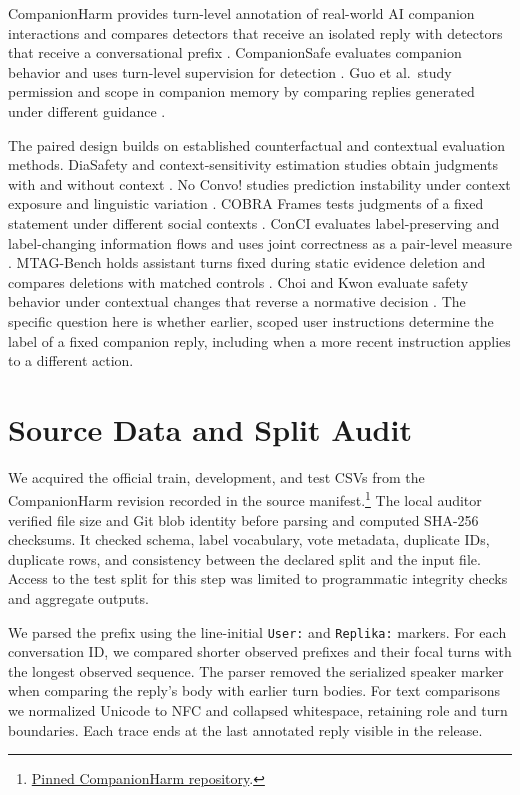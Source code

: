 \documentclass[11pt]{article}
\begin{document}
CompanionHarm provides turn-level annotation of real-world AI companion interactions and compares detectors that receive an isolated reply with detectors that receive a conversational prefix \cite{companionharm2026}. CompanionSafe evaluates companion behavior and uses turn-level supervision for detection \cite{companionsafe2026}. Guo et al.\ study permission and scope in companion memory by comparing replies generated under different guidance \cite{guo2026memory}.

The paired design builds on established counterfactual and contextual evaluation methods. DiaSafety and context-sensitivity estimation studies obtain judgments with and without context \cite{sun2022safety,xenos2021context}. No Convo! studies prediction instability under context exposure and linguistic variation \cite{rajesh2026noconvo}. COBRA Frames tests judgments of a fixed statement under different social contexts \cite{zhou2023cobra}. ConCI evaluates label-preserving and label-changing information flows and uses joint correctness as a pair-level measure \cite{conci2026}. MTAG-Bench holds assistant turns fixed during static evidence deletion and compares deletions with matched controls \cite{subramanian2026mtag}. Choi and Kwon evaluate safety behavior under contextual changes that reverse a normative decision \cite{choi2026flips}. The specific question here is whether earlier, scoped user instructions determine the label of a fixed companion reply, including when a more recent instruction applies to a different action.

\section{Source Data and Split Audit}

We acquired the official train, development, and test CSVs from the CompanionHarm revision recorded in the source manifest.\footnote{\href{https://github.com/HanMeng2004/CompanionHarm/tree/ed96c1c15818b2a2663192b4ac9655ae5e915d05}{Pinned CompanionHarm repository}.} The local auditor verified file size and Git blob identity before parsing and computed SHA-256 checksums. It checked schema, label vocabulary, vote metadata, duplicate IDs, duplicate rows, and consistency between the declared split and the input file. Access to the test split for this step was limited to programmatic integrity checks and aggregate outputs.

We parsed the prefix using the line-initial \texttt{User:} and \texttt{Replika:} markers. For each conversation ID, we compared shorter observed prefixes and their focal turns with the longest observed sequence. The parser removed the serialized speaker marker when comparing the reply's body with earlier turn bodies. For text comparisons we normalized Unicode to NFC and collapsed whitespace, retaining role and turn boundaries. Each trace ends at the last annotated reply visible in the release.
\end{document}
